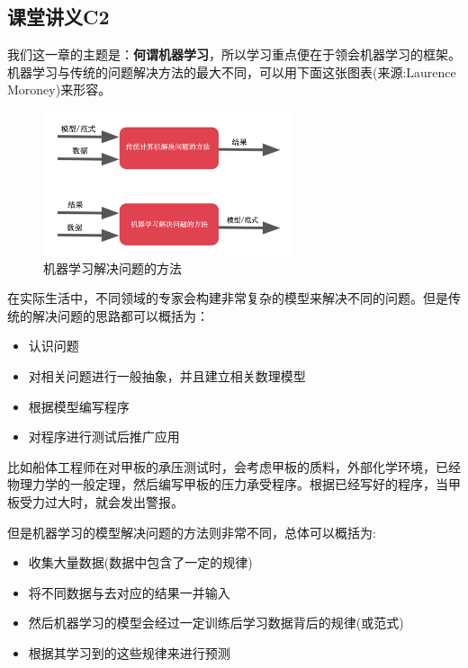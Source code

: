 \documentclass[12pt]{article}
\numberwithin{figure}{section}
\numberwithin{equation}{section}
\begin{document}
\subsection{课堂讲义C2}

我们这一章的主题是：\textbf{何谓机器学习}，所以学习重点便在于领会机器学习的框架。机器学习与传统的问题解决方法的最大不同，可以用下面这张图表(来源:Laurence Moroney)来形容。
\begin{figure}[H]
	\centering
	\includegraphics[width=0.65\textwidth]{fig/C1MLbigpct}
	\caption{机器学习解决问题的方法}
\end{figure}

在实际生活中，不同领域的专家会构建非常复杂的模型来解决不同的问题。但是传统的解决问题的思路都可以概括为：
\begin{itemize}
	\item 认识问题
	\item 对相关问题进行一般抽象，并且建立相关数理模型
	\item 根据模型编写程序
	\item 对程序进行测试后推广应用
\end{itemize}
比如船体工程师在对甲板的承压测试时，会考虑甲板的质料，外部化学环境，已经物理力学的一般定理，然后编写甲板的压力承受程序。根据已经写好的程序，当甲板受力过大时，就会发出警报。

但是机器学习的模型解决问题的方法则非常不同，总体可以概括为:
\begin{itemize}
	\item 收集大量数据(数据中包含了一定的规律)
	\item 将不同数据与去对应的结果一并输入
	\item 然后机器学习的模型会经过一定训练后学习数据背后的规律(或范式)
	\item 根据其学习到的这些规律来进行预测
\end{itemize}
\end{document}

